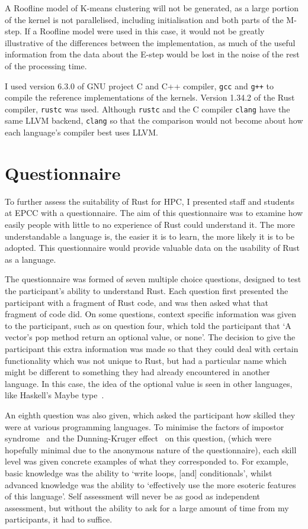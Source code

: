 A Roofline model of K-means clustering will not be generated, as a large portion of the kernel is not parallelised, including initialisation and both parts of the M-step. If a Roofline model were used in this case, it would not be greatly illustrative of the differences between the implementation, as much of the useful information from the data about the E-step would be lost in the noise of the rest of the processing time.

I used version 6.3.0 of GNU project C and C++ compiler, \texttt{gcc} and \texttt{g++} to compile the reference implementations of the kernels. Version 1.34.2 of the Rust compiler, \texttt{rustc} was used. Although \texttt{rustc} and the C compiler \texttt{clang} have the same LLVM backend, \texttt{clang} so that the comparison would not become about how each language's compiler best uses LLVM\@.
\section{Questionnaire}\label{sec:meth-q}
To further assess the suitability of Rust for HPC, I presented staff and students at EPCC with a questionnaire. The aim of this questionnaire was to examine how easily people with little to no experience of Rust could understand it. The more understandable a language is, the easier it is to learn, the more likely it is to be adopted. This questionnaire would provide valuable data on the usability of Rust as a language.

The questionnaire was formed of seven multiple choice questions, designed to test the participant's ability to understand Rust. Each question first presented the participant with a fragment of Rust code, and was then asked what that fragment of code did. On some questions, context specific information was given to the participant, such as on question four, which told the participant that `A vector's pop method return an optional value, or none'. The decision to give the participant this extra information was made so that they could deal with certain functionality which was not unique to Rust, but had a particular name which might be different to something they had already encountered in another language. In this case, the idea of the optional value is seen in other languages, like Haskell's Maybe type~\cite{HaskellMaybe}.

An eighth question was also given, which asked the participant how skilled they were at various programming languages.
To minimise the factors of impostor syndrome~\cite{langford1993} and the Dunning-Kruger effect~\cite{kruger1999} on this question, (which were hopefully minimal due to the anonymous nature of the questionnaire), each skill level was given concrete examples of what they corresponded to. For example, basic knowledge was the ability to `write loops, [and] conditionals', whilst advanced knowledge was the ability to `effectively use the more esoteric features of this language'. Self assessment will never be as good as independent assessment, but without the ability to ask for a large amount of time from my participants, it had to suffice.

